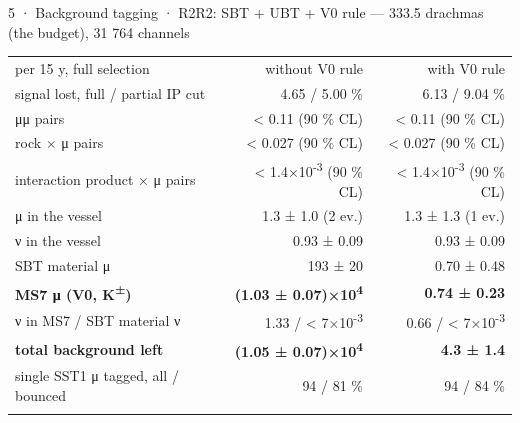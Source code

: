 \begin{btframe}{5 · Background tagging · R2}{R2: SBT + UBT + V0 rule — 333.5 drachmas (the budget), 31 764 channels}
{\centering {}\par}
\vspace{2.46pt}
\noindent \begin{minipage}[c]{0.5\linewidth}
{\fontsize{5.31pt}{6.90pt}\selectfont\setlength{\tabcolsep}{3.72pt}\renewcommand{\arraystretch}{1.42}
\begin{tabular}{lrr}
\textcolor{muted}{per 15 y, full selection} & \textcolor{muted}{without V0 rule} & \textcolor{muted}{with V0 rule} \\\headrule
signal lost, full / partial IP cut & 4.65 / 5.00 \% & 6.13 / 9.04 \% \\\rowrule
μμ pairs & < 0.11 (90 \% CL) & < 0.11 (90 \% CL) \\\rowrule
rock × μ pairs & < 0.027 (90 \% CL) & < 0.027 (90 \% CL) \\\rowrule
interaction product × μ pairs & < 1.4×10\textsuperscript{-3} (90 \% CL) & < 1.4×10\textsuperscript{-3} (90 \% CL) \\\rowrule
μ in the vessel & 1.3 ± 1.0 (2 ev.) & 1.3 ± 1.3 (1 ev.) \\\rowrule
ν in the vessel & 0.93 ± 0.09 & 0.93 ± 0.09 \\\rowrule
SBT material μ & 193 ± 20 & 0.70 ± 0.48 \\\rowrule
\rowcolor{tint}\bfseries MS7 μ (V0, K\textsuperscript{±}) & \bfseries (1.03 ± 0.07)×10\textsuperscript{4} & \bfseries 0.74 ± 0.23 \\\rowrule
ν in MS7 / SBT material ν & 1.33 / < 7×10\textsuperscript{-3} & 0.66 / < 7×10\textsuperscript{-3} \\\rowrule
\rowcolor{tint}\bfseries total background left & \bfseries (1.05 ± 0.07)×10\textsuperscript{4} & \bfseries 4.3 ± 1.4 \\\rowrule
single SST1 μ tagged, all / bounced & 94 / 81 \% & 94 / 84 \% \\\rowrule
\end{tabular}\par}
\end{minipage}%
\hfill%

\end{btframe}

